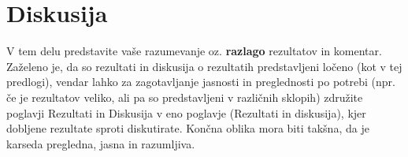 \chapter{Diskusija}\label{cha:diskusija}

V tem delu predstavite vaše razumevanje oz. \textbf{razlago} rezultatov in komentar. Zaželeno je, da so rezultati in diskusija o rezultatih predstavljeni ločeno (kot v tej predlogi), vendar lahko za zagotavljanje jasnosti in preglednosti po potrebi (npr. če je rezultatov veliko, ali pa so predstavljeni v različnih sklopih) združite poglavji Rezultati in Diskusija v eno poglavje (Rezultati in diskusija), kjer dobljene rezultate sproti diskutirate. Končna oblika mora biti takšna, da je karseda pregledna, jasna in razumljiva. 